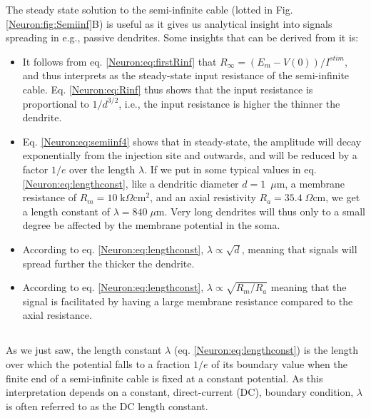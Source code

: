 The steady state solution to the semi-infinite cable (lotted in Fig. \ref{Neuron:fig:Semiinf}B) is useful as it gives us analytical insight into signals spreading in e.g., passive dendrites. Some insights that can be derived from it is:

\begin{itemize}

\item It follows from eq. \ref{Neuron:eq:firstRinf} that $R_{\infty} = (E_m-V(0))/I^{stim}$, and thus interprets as the steady-state input resistance of the semi-infinite cable. Eq. \ref{Neuron:eq:Rinf} thus shows that the input resistance is proportional to $1/d^{3/2}$, i.e., the input resistance is higher the thinner the dendrite. 

\item Eq. \ref{Neuron:eq:semiinf4} shows that in steady-state, the amplitude will decay exponentially from the injection site and outwards, and will be reduced by a factor $1/e$ over the length $\lambda$. If we put in some typical values in eq. \ref{Neuron:eq:lengthconst}, like a dendritic diameter $d=1$~$\mu$m, a membrane resistance of $R_m=10\;\text{k}\Omega\text{cm}^2$, and an axial resistivity $R_a=35.4\;\Omega\text{cm}$, we get a length constant of $\lambda = 840\; \mu$m. Very long dendrites will thus only to a small degree be affected by the membrane potential in the soma.

\item According to eq. \ref{Neuron:eq:lengthconst}, $\lambda \propto \sqrt{d}$, meaning that signals will spread further the thicker the dendrite.

\item According to eq. \ref{Neuron:eq:lengthconst}, $\lambda \propto \sqrt{R_m/R_a}$ meaning that the signal is facilitated by having a large membrane resistance compared to the axial resistance. 

\end{itemize}

\subsection{}
\label{sec:Neuron:cablefreq}
As we just saw, the length constant $\lambda$ (eq. \ref{Neuron:eq:lengthconst}) is the length over which the potential falls to a fraction $1/e$ of its boundary value when the finite end of a semi-infinite cable is fixed at a constant potential. As this interpretation depends on a constant, direct-current (DC), boundary condition, $\lambda$ is often referred to as the DC length constant. 

